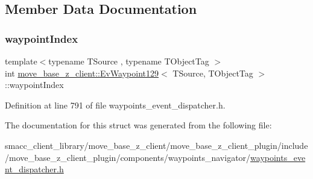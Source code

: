 \subsection{Member Data Documentation}
\mbox{\label{structmove__base__z__client_1_1EvWaypoint129_a0ecc94419950294a532bb537ae99147f}} 
\subsubsection{\texorpdfstring{waypoint\+Index}{waypointIndex}}
{\footnotesize\ttfamily template$<$typename T\+Source , typename T\+Object\+Tag $>$ \\
int \hyperlink{structmove__base__z__client_1_1EvWaypoint129}{move\+\_\+base\+\_\+z\+\_\+client\+::\+Ev\+Waypoint129}$<$ T\+Source, T\+Object\+Tag $>$\+::waypoint\+Index}



Definition at line 791 of file waypoints\+\_\+event\+\_\+dispatcher.\+h.



The documentation for this struct was generated from the following file\+:\begin{DoxyCompactItemize}
\item 
smacc\+\_\+client\+\_\+library/move\+\_\+base\+\_\+z\+\_\+client/move\+\_\+base\+\_\+z\+\_\+client\+\_\+plugin/include/move\+\_\+base\+\_\+z\+\_\+client\+\_\+plugin/components/waypoints\+\_\+navigator/\hyperlink{waypoints__event__dispatcher_8h}{waypoints\+\_\+event\+\_\+dispatcher.\+h}\end{DoxyCompactItemize}
